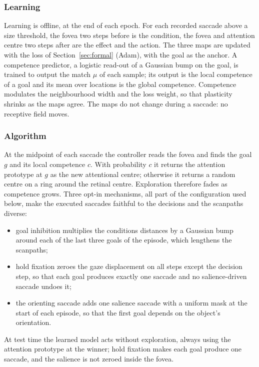 \documentclass[14pt]{article}
\begin{document}
\subsubsection{Learning}

Learning is offline, at the end of each epoch.
For each recorded saccade above a size threshold, the fovea two steps before is the condition, the fovea and attention centre two steps after are the effect and the action.
The three maps are updated with the loss of Section~\ref{sec:formal} (Adam), with the goal as the anchor.
A competence predictor, a logistic read-out of a Gaussian bump on the goal, is trained to output the match $\mu$ of each sample; its output is the local competence of a goal and its mean over locations is the global competence.
Competence modulates the neighbourhood width and the loss weight, so that plasticity shrinks as the maps agree.
The maps do not change during a saccade: no receptive field moves.

\subsubsection{Algorithm}

At the midpoint of each saccade the controller reads the fovea and finds the goal $g$ and its local competence $c$.
With probability $c$ it returns the attention prototype at $g$ as the new attentional centre; otherwise it returns a random centre on a ring around the retinal centre.
Exploration therefore fades as competence grows.
Three opt-in mechanisms, all part of the configuration used below, make the executed saccades faithful to the decisions and the scanpaths diverse:
\begin{itemize}
    \item goal inhibition multiplies the conditions distances by a Gaussian bump around each of the last three goals of the episode, which lengthens the scanpaths;
    \item hold fixation zeroes the gaze displacement on all steps except the decision step, so that each goal produces exactly one saccade and no salience-driven saccade undoes it;
    \item the orienting saccade adds one salience saccade with a uniform mask at the start of each episode, so that the first goal depends on the object's orientation.
\end{itemize}
At test time the learned model acts without exploration, always using the attention prototype at the winner; hold fixation makes each goal produce one saccade, and the salience is not zeroed inside the fovea.
\end{document}
